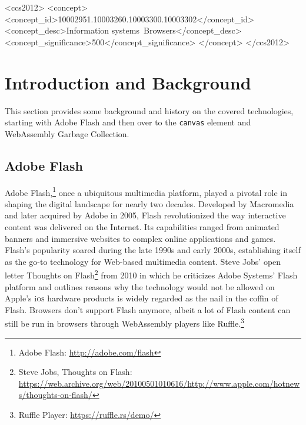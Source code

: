 \documentclass[sigconf]{acmart}
\begin{document}
\begin{CCSXML}
<ccs2012>
<concept>
<concept_id>10002951.10003260.10003300.10003302</concept_id>
<concept_desc>Information systems~Browsers</concept_desc>
<concept_significance>500</concept_significance>
</concept>
</ccs2012>
\end{CCSXML}



\maketitle

\section{Introduction and Background}

This section provides some background and history on the covered technologies, starting with Adobe Flash and then over to the \texttt{canvas} element and WebAssembly Garbage Collection.

\subsection{Adobe Flash}

Adobe Flash,\footnote{Adobe Flash: \url{http://adobe.com/flash}} once a ubiquitous multimedia platform, played a pivotal role in shaping the digital landscape for nearly two decades. Developed by Macromedia and later acquired by Adobe in 2005, Flash revolutionized the way interactive content was delivered on the Internet. Its capabilities ranged from animated banners and immersive websites to complex online applications and games. Flash's popularity soared during the late 1990s and early 2000s, establishing itself as the go-to technology for Web-based multimedia content. Steve Jobs' open letter Thoughts on Flash\footnote{Steve Jobs, Thoughts on Flash: \url{https://web.archive.org/web/20100501010616/http://www.apple.com/hotnews/thoughts-on-flash/}} from 2010 in which he criticizes Adobe Systems' Flash platform and outlines reasons why the technology would not be allowed on Apple's i\textsc{os} hardware products is widely regarded as the nail in the coffin of Flash. Browsers don't support Flash anymore, albeit a lot of Flash content can still be run in browsers through WebAssembly players like Ruffle.\footnote{Ruffle Player: \url{https://ruffle.rs/demo/}}
\end{document}
